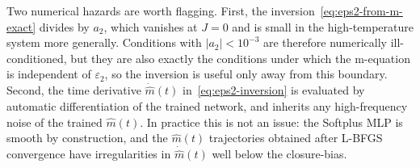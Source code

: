 \documentclass[conference]{IEEEtran}
\newcommand{\mhat}{\hat m(t)}
\newcommand{\epstwo}{\varepsilon_2}
\begin{document}
Two numerical hazards are worth flagging. First, the
inversion~\eqref{eq:eps2-from-m-exact} divides by $a_2$, which
vanishes at $J = 0$ and is small in the high-temperature system more
generally. Conditions with $|a_2| < 10^{-3}$ are therefore numerically
ill-conditioned, but they are also exactly the conditions under which
the m-equation is independent of $\epstwo$, so the inversion is
useful only away from this boundary. Second, the time derivative
$\dot{\hat m}(t)$ in~\eqref{eq:eps2-inversion} is evaluated by
automatic differentiation of the trained network, and inherits any
high-frequency noise of the trained $\mhat$. In practice this is
not an issue: the Softplus MLP is smooth by construction, and the
$\mhat$ trajectories obtained after L-BFGS convergence have
irregularities in $\dot{\hat m}(t)$ well below the closure-bias.



\end{document}
